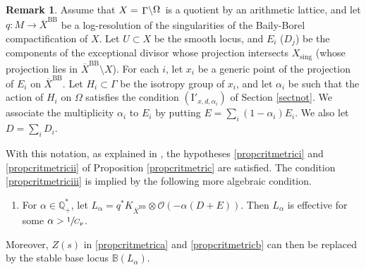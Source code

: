 \documentclass[JEP,XML,SOM,Unicode, NoEqCountersInSection,NoFloatCountersInSection,published]{cedram}
\let\mathcal\mathscr
\newcommand{\rBB}{\mathrm{BB}}
\newcommand{\rI}{\mathrm{I}}
\newcommand{\sing}{\mathrm{sing}}
\theoremstyle{theorem}
\theoremstyle{definition}
\newtheorem{remark}[proposition]{Remark}
\newcommand{\quotient}[2]{{\left.\raisebox{-.08em}{$#1$}\middle\backslash\raisebox{.08em}{$#2$}\right.}}
\begin{document}
\begin{remark} \label{remcritmet} Assume that $X = \quotient{\Gamma}{\Omega}$ is a quotient by an arithmetic lattice, and let $q : M \to \overline{X}^{\rBB}$ be a log-resolution of the singularities of the Baily-Borel compactification of $X$. Let $U \subset X$ be the smooth locus, and $E_i$ (\resp $D_j$) be the components of the exceptional divisor whose projection intersects $X_{\sing}$ (\resp whose projection lies in $\overline{X}^{\rBB} \setminus X$). For each $i$, let $x_i$ be a generic point of the projection of $E_i$ on $\overline{X}^{\rBB}$. Let $H_i \subset \Gamma$ be the isotropy group of $x_i$, and let $\alpha_i$ be such that the action of $H_{i}$ on $\Omega$ satisfies the condition $(\rI'_{x, d, \alpha_i})$ of Section \ref{sectnot}. We associate the multiplicity $\alpha_i$ to $E_i$ by putting $E = \sum_i (1 - \alpha_i) E_i$. We also let $D = \sum_i D_i$.

With this notation, as explained in \cite[\S 4]{cad18}, the hypotheses \eqref{propcritmetrici} and \eqref{propcritmetricii} of Proposition \ref{propcritmetric} are satisfied. The condition \eqref{propcritmetriciii} is implied by the following more algebraic condition.
\begin{enumerate}
\item[$(\ref{propcritmetriciii}')$]
For $\alpha \in \mathbb Q^\ast_+$, let $L_{\alpha} = q^\ast K_{\overline{X}^{\rBB}} \otimes \mathcal O( - \alpha (D + E)) $. Then $L_{\alpha}$ is effective for some $\alpha > \sfrac{1}{C_p}$.
\end{enumerate}

Moreover, $Z(s)$ in \eqref{propcritmetrica} and \eqref{propcritmetricb} can then be replaced by the stable base locus $\mathbb B(L_\alpha)$.
\end{remark}
\end{document}
